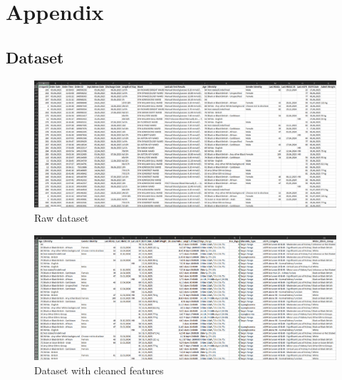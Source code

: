 \section{Appendix}

\subsection{Dataset} \label{app:Dataset}

	\begin{figure}[H]
		\centering
		\includegraphics[width=9in, angle=90]{figures/dataset_screenshot_xl.png}
		\caption{Raw dataset}
		\label{fig:rawDataset}
	\end{figure}

	\begin{figure}[H]
		\centering
		\includegraphics[width=9.5in, angle=90]{figures/cleaned_dataset_screenshot_xl.png}
		\caption{Dataset with cleaned features}
		\label{fig:cleanedDataset}
	\end{figure}




